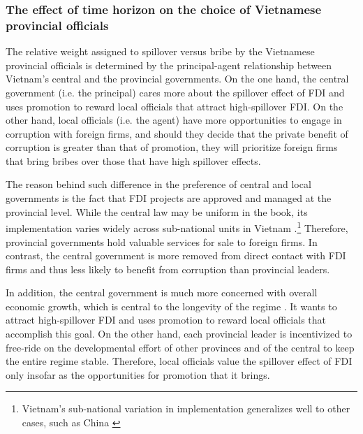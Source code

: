 \subsubsection{The effect of time horizon on the choice of Vietnamese provincial officials} 

The relative weight assigned to spillover versus bribe by the Vietnamese provincial officials is determined by the principal-agent relationship between Vietnam's central and the provincial governments. On the one hand, the central government (i.e. the principal) cares more about the spillover effect of FDI and uses promotion to reward local officials that attract high-spillover FDI. On the other hand, local officials (i.e. the agent) have more opportunities to engage in corruption with foreign firms, and should they decide that the private benefit of corruption is greater than that of promotion, they will prioritize foreign firms that bring bribes over those that have high spillover effects.

The reason behind such difference in the preference of central and local governments is the fact that FDI projects are approved and managed at the provincial level. While the central law may be uniform in the book, its implementation varies widely across sub-national units in Vietnam \citep{Meyer2005}.\footnote{Vietnam's sub-national variation in implementation generalizes well to other cases, such as China \citep{Thun2006}} Therefore, provincial governments hold valuable services for sale to foreign firms. In contrast, the central government is more removed from direct contact with FDI firms and thus less likely to benefit from corruption than provincial leaders. 

In addition, the central government is much more concerned with overall economic growth, which is central to the longevity of the regime \citep{Malesky2008}. It wants to attract high-spillover FDI and uses promotion to reward local officials that accomplish this goal. On the other hand, each provincial leader is incentivized to free-ride on the developmental effort of other provinces and of the central to keep the entire regime stable. Therefore, local officials value the spillover effect of FDI only insofar as the opportunities for promotion that it brings.

